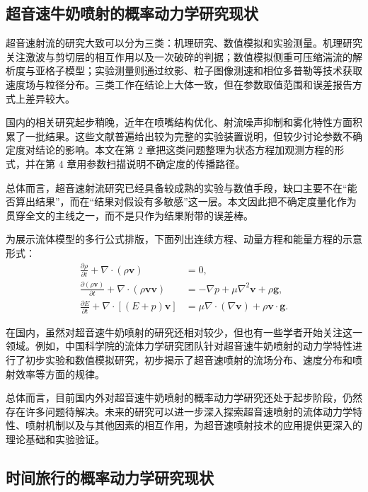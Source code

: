 \subsection{超音速牛奶喷射的概率动力学研究现状}

超音速射流的研究大致可以分为三类：机理研究、数值模拟和实验测量。机理研究关注激波与剪切层的相互作用以及一次破碎的判据；数值模拟侧重可压缩湍流的解析度与亚格子模型；实验测量则通过纹影、粒子图像测速和相位多普勒等技术获取速度场与粒径分布。三类工作在结论上大体一致，但在参数取值范围和误差报告方式上差异较大。

国内的相关研究起步稍晚，近年在喷嘴结构优化、射流噪声抑制和雾化特性方面积累了一批结果。这些文献普遍给出较为完整的实验装置说明，但较少讨论参数不确定度对结论的影响。本文在第 2 章把这类问题整理为状态方程加观测方程的形式，并在第 4 章用参数扫描说明不确定度的传播路径。

总体而言，超音速射流研究已经具备较成熟的实验与数值手段，缺口主要不在“能否算出结果”，而在“结果对假设有多敏感”这一层。本文因此把不确定度量化作为贯穿全文的主线之一，而不是只作为结果附带的误差棒。

为展示流体模型的多行公式排版，下面列出连续方程、动量方程和能量方程的示意形式：
\begin{equation}
  \begin{aligned}
    \frac{\partial\rho}{\partial t}+\nabla\cdot(\rho\bm{v}) &= 0,\\
    \frac{\partial(\rho\bm{v})}{\partial t}
      +\nabla\cdot(\rho\bm{v}\bm{v})
      &= -\nabla p+\mu\nabla^2\bm{v}+\rho\bm{g},\\
    \frac{\partial E}{\partial t}
      +\nabla\cdot[(E+p)\bm{v}]
      &= \mu\nabla\cdot(\nabla\bm{v})+\rho\bm{v}\cdot\bm{g}.
  \end{aligned}
  \label{eq:navier-stokes}
\end{equation}

在国内，虽然对超音速牛奶喷射的研究还相对较少，但也有一些学者开始关注这一领域。例如，中国科学院的流体力学研究团队针对超音速牛奶喷射的动力学特性进行了初步实验和数值模拟研究，初步揭示了超音速喷射的流场分布、速度分布和喷射效率等方面的规律。

总体而言，目前国内外对超音速牛奶喷射的概率动力学研究还处于起步阶段，仍然存在许多问题待解决。未来的研究可以进一步深入探索超音速喷射的流体动力学特性、喷射机制以及与其他因素的相互作用，为超音速喷射技术的应用提供更深入的理论基础和实验验证。

\subsection{时间旅行的概率动力学研究现状}

